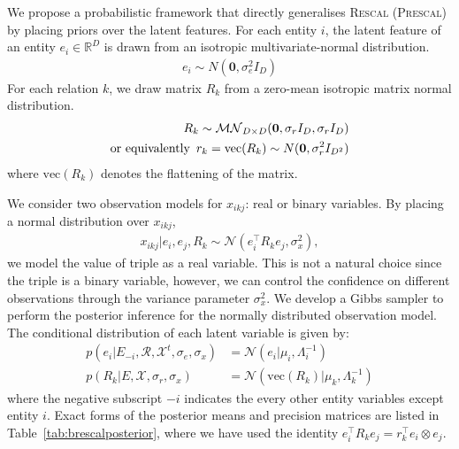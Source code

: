 We propose a probabilistic framework that directly generalises \textsc{Rescal} (\textsc{Prescal})
by placing priors over the
latent features. For each entity $i$, the latent feature of an entity $e_i \in
\mathbb{R}^{D}$ is drawn from an isotropic multivariate-normal distribution.
\begin{align}
\label{eqn:entity_gen}
e_i \sim {N}(\mathbf{0}, \sigma_e^2{I}_D)
\end{align}
For each relation $k$, we draw matrix $R_k$ from
a zero-mean isotropic matrix normal distribution.
\begin{align}
\label{eqn:relation_gen}
R_k \sim \mathcal{MN}_{D \times D}(\mathbf{0}, \sigma_r{I}_D, \sigma_r{I}_D) \\
\text{or equivalently}\enspace r_k  = \text{vec}(R_k) \sim N(\mathbf{0}, \sigma_r^2 I_{D^2}) \notag
\end{align}
where $\text{vec}(R_k)$ denotes the flattening of the matrix.

We consider two observation models for $x_{ikj}$: real or binary variables. By placing a
normal distribution over $x_{ikj}$,
\begin{align}
  x_{ikj} |e_i, e_j, R_k \sim \mathcal{N}(e_i^{\top} R_k e_j, \sigma_x^2),\label{eqn:triple_gen}
\end{align}
we model the value of triple as a real variable.
This is not a natural choice since the triple is a binary variable, however, we can control the confidence on different observations
through the variance parameter $\sigma_x^2$.
We develop a Gibbs sampler to perform the posterior inference for the normally distributed observation model. The conditional distribution of each latent variable is given by:
\begin{align}
p(e_i |E_{-i}, \mathcal{R}, \mathcal{X}^{t}, \sigma_e, \sigma_x) &= \mathcal{N}(e_i | \mu_i,
\Lambda_i^{-1})  \label{eqn:sample_e} \\
p(R_k|E, \mathcal{X}, \sigma_r, \sigma_x) &= \mathcal{N}(\text{vec}(R_k) |
\mu_k, \Lambda_k^{-1}) \label{eqn:sample_r}
\end{align}
where the negative subscript $-i$ indicates the every other entity variables except entity $i$.
Exact forms of the posterior means and precision matrices are listed in Table~\ref{tab:brescalposterior}, where we have
used the identity $e_i^{\top} R_k e_j = r_k^{\top} e_i \otimes e_j$.

